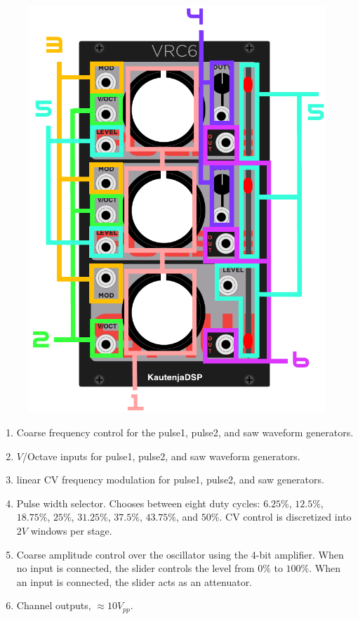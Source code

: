 \documentclass[12pt,letter]{article}
\begin{document}
\begin{figure}[!htp]
\centering
\includegraphics{VRC6-Manual}
\end{figure}

\begin{enumerate}
  \item Coarse frequency control for the pulse1, pulse2, and saw waveform generators.
  \item $V$/Octave inputs for pulse1, pulse2, and saw waveform generators.
  \item linear CV frequency modulation for pulse1, pulse2, and saw generators.
  \item Pulse width selector. Chooses between eight duty cycles: $6.25\%$, $12.5\%$, $18.75\%$, $25\%$, $31.25\%$, $37.5\%$, $43.75\%$, and $50\%$. CV control is discretized into $2V$ windows per stage.
  \item Coarse amplitude control over the oscillator using the 4-bit amplifier. When no input is connected, the slider controls the level from $0\%$ to $100\%$. When an input is connected, the slider acts as an attenuator.
  \item Channel outputs, ${\approx}10V_{pp}$.
\end{enumerate}


\clearpage
\renewcommand\refname{References \& Acknowledgments}
\nocite{*}


\end{document}
